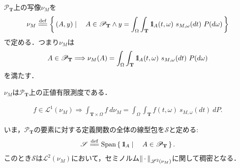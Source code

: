 	\begin{prf}
	\end{prf}
	
	$\mathscr{P}_{\mathbf{T}}$上の写像$\nu_M$を
	\begin{align}
		\nu_M \defeq \Set{(A,y)}{A \in \mathscr{P}_{\mathbf{T}} \wedge y = 
		\int_\Omega \int_{\mathbf{T}} \defunc_A(t,\omega)\ s_{M,\omega}(dt)\ P(d\omega)}
	\end{align}
	で定める．つまり$\nu_M$は
	\begin{align}
		A \in \mathscr{P}_{\mathbf{T}} \Longrightarrow
		\nu_M(A) = \int_\Omega \int_{\mathbf{T}} \defunc_A(t,\omega)\ s_{M,\omega}(dt)\ P(d\omega)
	\end{align}
	を満たす．
	
	\begin{screen}
		\begin{thm}[二乗可積分マルチンゲールで構成する測度]
			$\nu_M$は$\mathscr{P}_{\mathbf{T}}$上の正値有限測度である．
		\end{thm}
	\end{screen}
	
	\begin{screen}
		\begin{thm}[可積分可予測過程の積分表現]
			\begin{align}
				f \in \mathscr{L}^1(\nu_M) \Longrightarrow 
				\int_{\mathbf{T} \times \Omega} f\ d\nu_M = \int_\Omega \int_{\mathbf{T}} f(t,\omega)\ s_{M,\omega}(dt)\ dP.
			\end{align}
		\end{thm}
	\end{screen}
	
	いま，$\mathscr{P}_{\mathbf{T}}$の要素に対する定義関数の全体の線型包を$\mathscr{S}$と定める:
	\begin{align}
		\mathscr{S} \defeq \operatorname{Span}\Set{\defunc_A}{A \in \mathscr{P}_{\mathbf{T}}}.
	\end{align}
	このとき$\mathscr{S}$は$\mathscr{L}^2(\nu_M)$において，セミノルム$\left\|\, \cdot\, \right\|_{\mathscr{L}^2(\nu_M)}$に関して稠密となる．
	
	\begin{screen}
		\begin{thm}
			
		\end{thm}
	\end{screen}
